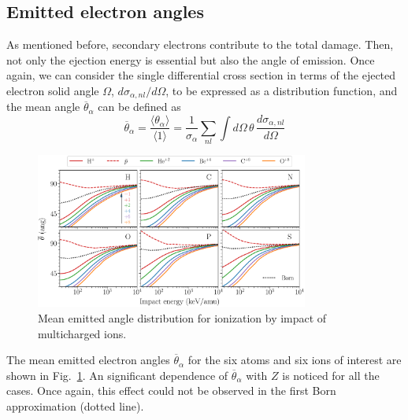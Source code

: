 \documentclass[preprint,showpacs]{revtex4}
\begin{document}
\subsection{Emitted electron angles}
\label{subsec:meanang}

As mentioned before, secondary electrons contribute to the total damage. 
Then, not only the ejection energy is essential but also the angle 
of emission. Once again, we can consider the single differential cross 
section in terms of the ejected electron solid angle $\Omega$, 
$d\sigma_{\alpha,nl}/d\Omega$, to be expressed as a distribution function, 
and the mean angle $\overline{\theta}_{\alpha}$ can be defined as
\begin{equation}
\overline{\theta}_{\alpha}=\frac{\langle\theta_{\alpha}\rangle}
{\langle 1\rangle}=\frac{1}{\sigma_{\alpha}}\sum\limits_{nl}
\int d\Omega\,\theta\,\frac{d\sigma_{\alpha,nl}}{d\Omega}
\end{equation}

\begin{figure}[t!]
\centering
\includegraphics[width=0.8\textwidth]{figuras/ang_mean.eps}
\caption{Mean emitted angle distribution for ionization by impact of
multicharged ions.}
\label{fig:emittedang}
\end{figure} 

The mean emitted electron angles $\overline{\theta}_{\alpha}$ for the 
six atoms and six ions of interest are shown in Fig.~\ref{fig:emittedang}.
An significant dependence of $\overline{\theta}_{\alpha}$ with $Z$ is 
noticed for all the cases. Once again, this effect could not be 
observed in the first Born approximation (dotted line).
\end{document}
